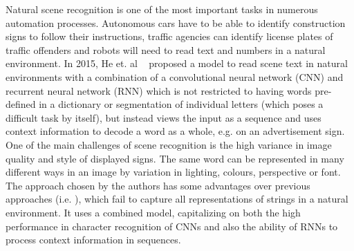 \documentclass{utue} %
\begin{document}
Natural scene recognition is one of the most important tasks in numerous automation processes. Autonomous cars have to be able to identify construction signs to follow their instructions, traffic agencies can identify license plates of traffic offenders %
and robots will need to read text and numbers in a natural environment. In 2015, He et. al ~\cite{2015arXiv150604395H} proposed a model to read scene text in natural environments with a combination of a convolutional neural network (CNN) and recurrent neural network (RNN) which is not restricted to having words pre-defined in a dictionary or segmentation of individual letters (which poses a difficult task by itself), but instead views the input as a sequence and uses context information to decode a word as a whole, e.g. on an advertisement sign. One of the main challenges of scene recognition is the high variance in image quality and style of displayed signs. The same word can be represented in many different ways in an image by variation in lighting, colours, perspective or font. The approach chosen by the authors has some advantages over previous approaches (i.e. %
), which fail to capture all representations of strings in a natural environment. It uses a combined model, capitalizing on both the high performance in character recognition of CNNs and also the ability of RNNs to process context information in sequences. \\
\end{document}
